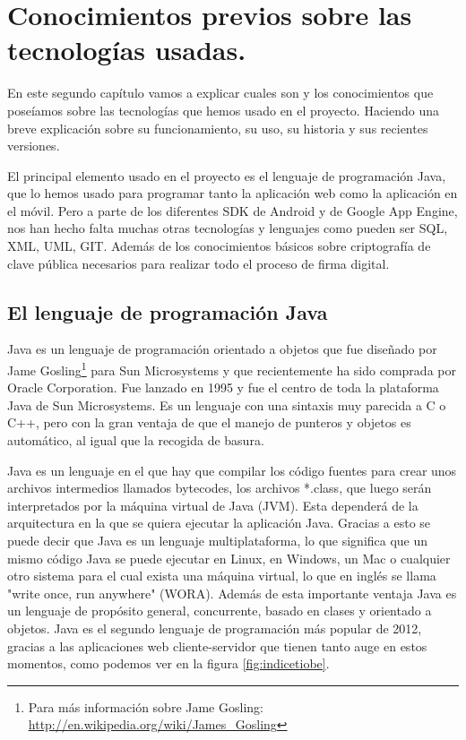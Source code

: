 \chapter[Conocimientos previos]{Conocimientos previos sobre las tecnologías usadas.}\label{cap:conocimientos}

En este segundo capítulo vamos a explicar cuales son y los conocimientos que poseíamos sobre las tecnologías que hemos usado en el proyecto. Haciendo una breve explicación sobre su funcionamiento, su uso, su historia y sus recientes versiones.

El principal elemento usado en el proyecto es el lenguaje de programación Java, que lo hemos usado para programar tanto la aplicación web como la aplicación en el móvil. Pero a parte de los diferentes SDK de Android y de Google App Engine, nos han hecho falta muchas otras tecnologías y lenguajes como pueden ser SQL, XML, UML, GIT. Además de los conocimientos básicos sobre criptografía de clave pública necesarios para realizar todo el proceso de firma digital.   

\section{El lenguaje de programación Java}

Java es un lenguaje de programación orientado a objetos que fue diseñado por Jame Gosling\footnote{Para más información sobre Jame Gosling: \url{http://en.wikipedia.org/wiki/James\_Gosling}} para Sun Microsystems y que recientemente ha sido comprada por Oracle Corporation. Fue lanzado en 1995 y fue el centro de toda la plataforma Java de Sun Microsystems. Es un lenguaje con una sintaxis muy parecida a C o C++, pero con la gran ventaja de que el manejo de punteros y objetos es automático, al igual que la recogida de basura.

Java es un lenguaje en el que hay que compilar los código fuentes para crear unos archivos intermedios llamados bytecodes, los archivos *.class, que luego serán interpretados por la máquina virtual de Java (JVM). Esta dependerá de la arquitectura en la que se quiera ejecutar la aplicación Java. Gracias a esto se puede decir que Java es un lenguaje multiplataforma, lo que significa que un mismo código Java se puede ejecutar en Linux, en Windows, un Mac o cualquier otro sistema para el cual exista una máquina virtual, lo que en inglés se llama "write once, run anywhere" (WORA). Además de esta importante ventaja Java es un lenguaje de propósito general, concurrente, basado en clases y orientado a objetos. Java es el segundo lenguaje de programación más popular de 2012, gracias a las aplicaciones web cliente-servidor que tienen tanto auge en estos momentos, como podemos ver en la figura \ref{fig:indicetiobe}.

